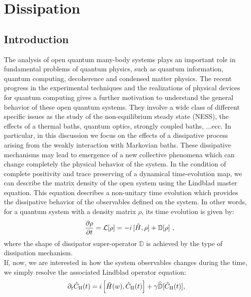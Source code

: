 \chapter{Dissipation}
\label{chp_diss}


\section{Introduction}

The analysis of open quantum many-body systems plays an important role in fundamental problems of quantum physics, such as quantum information, quantum computing, decoherence and condensed matter physics. The recent progress in the experimental techniques and the realizations of physical devices for quantum computing gives a further motivation to understand the general behavior of these open quantum systems. They involve a wide class of different specific issues as the study of the non-equilibrium steady state (NESS), the effects of a thermal baths, quantum optics, strongly coupled baths, ...ecc. In particular, in this discussion we focus on the effects of a dissipative process arising from the weakly interaction with Markovian baths. These dissipative mechanisms may lead to emergence of a new collective phenomena which can change completely the physical behavior of the system. In the condition of complete positivity and trace preserving of a dynamical time-evolution map, we can describe the matrix density of the open system using the Lindblad master equation. This equation describes a non-unitary time evolution which provides the dissipative behavior of the observables defined on the system. 
In other words, for a quantum system with a density matrix 
$\rho$, its time evolution is given by:
\begin{eqnarray}
        &&  {\partial\rho\over \partial t} = {\cal L}[\rho]=
          - i \, [ \hat H,\rho]
          + {\mathbb D}[\rho]\,\,,
          \label{eqlindblad}
\end{eqnarray}
where the shape of dissipator super-operator ${\mathbb D}$ is 
achieved by the type of dissipation mechanism.\\
If, now, we are interested in how the system observables
changes during the time, we simply resolve the associated
Lindblad operator equation:
\begin{eqnarray}
    \partial_t \hat{C}_{\rm H}(t)   = i\,\Bigr[\hat{H}(w),
      \hat{C}_{\rm H}(t) \Bigr] + \gamma
    \widehat{\mathbb{D}}[\hat{C}_{\rm H}(t)],
    \label{operatoreqlindblad}
 \end{eqnarray}
